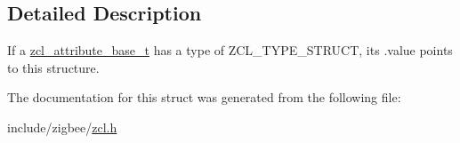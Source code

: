 \subsection{Detailed Description}
If a \hyperlink{structzcl__attribute__base__t}{zcl\-\_\-attribute\-\_\-base\-\_\-t} has a type of Z\-C\-L\-\_\-\-T\-Y\-P\-E\-\_\-\-S\-T\-R\-U\-C\-T, its .value points to this structure. 

The documentation for this struct was generated from the following file\-:\begin{DoxyCompactItemize}
\item 
include/zigbee/\hyperlink{zcl_8h}{zcl.\-h}\end{DoxyCompactItemize}
